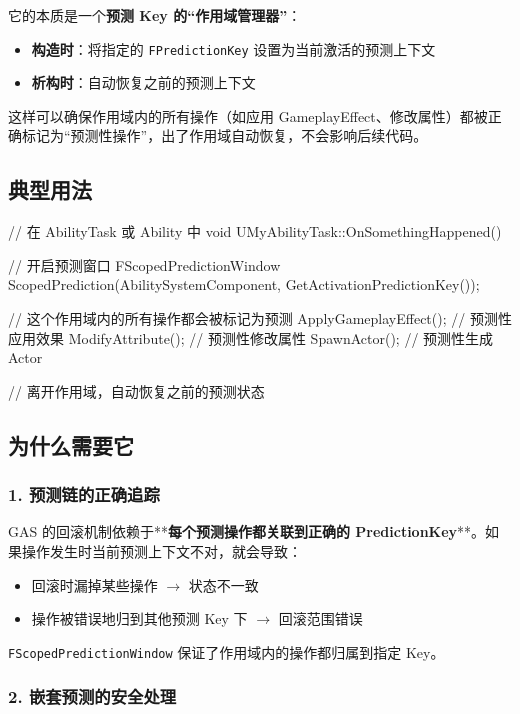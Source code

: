 \documentclass[10pt,CJKmath]{ctexart}
\begin{document}
它的本质是一个\textbf{预测 Key 的``作用域管理器''}：

\begin{itemize}
	\item \textbf{构造时}：将指定的 \texttt{FPredictionKey} 设置为当前激活的预测上下文
	\item \textbf{析构时}：自动恢复之前的预测上下文
\end{itemize}

这样可以确保作用域内的所有操作（如应用 GameplayEffect、修改属性）都被正确标记为“预测性操作”，出了作用域自动恢复，不会影响后续代码。

\subsection{典型用法}

\begin{code}
	// 在 AbilityTask 或 Ability 中
	void UMyAbilityTask::OnSomethingHappened()
	{
		// 开启预测窗口
		FScopedPredictionWindow ScopedPrediction(AbilitySystemComponent, GetActivationPredictionKey());
		
		// 这个作用域内的所有操作都会被标记为预测
		ApplyGameplayEffect();   // 预测性应用效果
		ModifyAttribute();       // 预测性修改属性
		SpawnActor();            // 预测性生成Actor
		
	} // 离开作用域，自动恢复之前的预测状态
\end{code}

\subsection{为什么需要它}

\subsubsection{1. 预测链的正确追踪}

GAS 的回滚机制依赖于**\textbf{每个预测操作都关联到正确的 PredictionKey}**。如果操作发生时当前预测上下文不对，就会导致：

\begin{itemize}
	\item 回滚时漏掉某些操作 $\rightarrow$ 状态不一致
	\item 操作被错误地归到其他预测 Key 下 $\rightarrow$ 回滚范围错误
\end{itemize}

\texttt{FScopedPredictionWindow} 保证了作用域内的操作都归属到指定 Key。

\subsubsection{2. 嵌套预测的安全处理}
\end{document}

